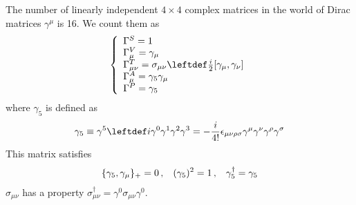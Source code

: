 The number of linearly independent $4 \times 4$ complex matrices
in the world of Dirac matrices $\gamma^\mu$ is 16.
We count them as
\begin{eqnarray}
\left\{
\begin{array}{l}
\Gamma^S
=
1
\\
\Gamma^V_\mu
=
\gamma_\mu
\\
\Gamma^T_{\mu \nu}
=
\sigma_{\mu \nu} \leftdef
\frac{i}{2}
[ \gamma_\mu, \gamma_\nu]
\\
\Gamma^A_{\mu}
=
\gamma_5 \gamma_\mu
\\
\Gamma^P
=
\gamma_5
\end{array}
\right.
\end{eqnarray}
where $\gamma_5$ is defined as
\begin{eqnarray}
\gamma_5 \equiv \gamma^5 \leftdef
i \gamma^0 \gamma^1 \gamma^2 \gamma^3
=
- \frac{i}{4!}
\epsilon_{\mu \nu \rho \sigma}
\gamma^\mu \gamma^\nu \gamma^\rho \gamma^\sigma
\end{eqnarray}
This matrix satisfies
\begin{eqnarray}
\{
\gamma_5, \gamma_\mu 
\}_+ = 0\,,
\hspace{3mm}
(\gamma_5)^2 = 1\,,
\hspace{3mm}
\gamma_5^\dagger = \gamma_5
\end{eqnarray}
$\sigma_{\mu \nu}$ has a property $\sigma_{\mu \nu}^\dagger = \gamma^0 \sigma_{\mu \nu} \gamma^0$.

\bigskip

